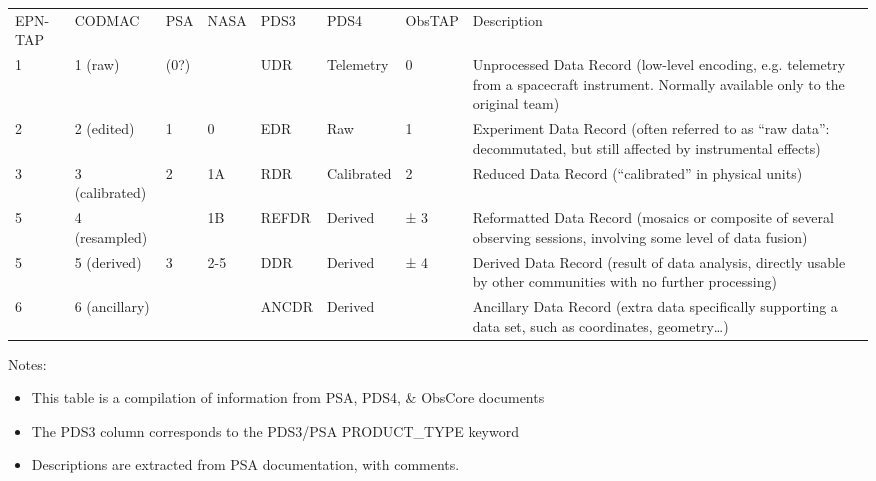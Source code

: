 \documentclass[11pt,a4paper]{ivoa}
\begin{document}
\begingroup\small\begin{inlinetable}

\begin{tabular}{lllllllp{}}

\sptablerule

EPN-TAP&CODMAC&PSA&NASA&PDS3&PDS4&ObsTAP&Description\\

\sptablerule

1 &1 (raw)&(0?)&&UDR&Telemetry&0&Unprocessed Data Record (low-level encoding, e.g. telemetry from a spacecraft instrument. Normally available only to the original team)\\

2 &2 (edited)&1&0&EDR&Raw&1&Experiment Data Record (often referred to as ``raw data'': decommutated, but still affected by instrumental effects)\\

3 &3 (calibrated)&2&1A&RDR&Calibrated&2&Reduced Data Record (``calibrated'' in physical units)\\

5&4 (resampled)&&1B&REFDR&Derived&± 3&Reformatted Data Record (mosaics or composite of several observing sessions, involving some level of data fusion)\\

5 &5 (derived)&3&2-5&DDR&Derived&± 4&Derived Data Record (result of data analysis, directly usable by other communities with no further processing)\\

6&6 (ancillary)&&&ANCDR&Derived&&Ancillary Data Record (extra data specifically supporting a data set, such as coordinates, geometry…) \\

\end{tabular}

\end{inlinetable}\endgroup

Notes:

\begin{itemize}

\item This table is a compilation of information from PSA, PDS4, \& ObsCore documents

\item The PDS3 column corresponds to the PDS3/PSA PRODUCT\_TYPE keyword

\item Descriptions are extracted from PSA documentation, with comments.

\end{itemize}
\end{document}
